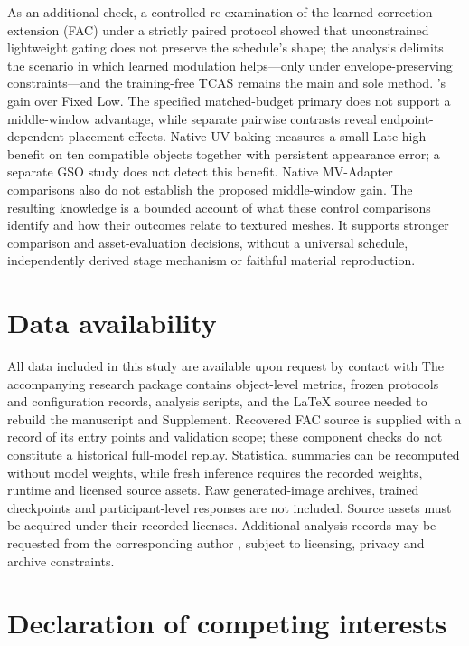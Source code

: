 \documentclass[times,twocolumn,final]{elsarticle}
\providecommand{\DIFadd}[1]{{\protect\color{blue} \sf #1}} %
\providecommand{\DIFdel}[1]{{\protect\color{red} \scriptsize #1}} %
\providecommand{\DIFaddbegin}{} %
\providecommand{\DIFaddend}{} %
\providecommand{\DIFdelbegin}{} %
\providecommand{\DIFdelend}{} %
\begin{document}
\DIFdel{As an additional check, a controlled re-examination of the learned-correction extension (FAC) under a strictly paired protocol showed that unconstrained lightweight gating does not preserve the schedule's shape; the analysis delimits the scenario in which learned modulation helps---only under envelope-preserving constraints---and the training-free TCAS remains the main and sole method. }\DIFdelend \DIFaddbegin \DIFadd{'s gain over Fixed Low. The specified matched-budget primary does not support a middle-window advantage, while separate pairwise contrasts reveal endpoint-dependent placement effects. Native-UV baking measures a small Late-high benefit on ten compatible objects together with persistent appearance error; a separate GSO study does not detect this benefit. Native MV-Adapter comparisons also do not establish the proposed middle-window gain. The resulting knowledge is a bounded account of what these control comparisons identify and how their outcomes relate to textured meshes. It supports stronger comparison and asset-evaluation decisions, without a universal schedule, independently derived stage mechanism or faithful material reproduction.
}\DIFaddend 

\section*{Data availability}

\DIFdelbegin \DIFdel{All data included in this study are available upon request by contact with }\DIFdelend \DIFaddbegin \DIFadd{The accompanying research package contains object-level metrics, frozen protocols and configuration records, analysis scripts, and the LaTeX source needed to rebuild the manuscript and Supplement. Recovered FAC source is supplied with a record of its entry points and validation scope; these component checks do not constitute a historical full-model replay. Statistical summaries can be recomputed without model weights, while fresh inference requires the recorded weights, runtime and licensed source assets. Raw generated-image archives, trained checkpoints and participant-level responses are not included. Source assets must be acquired under their recorded licenses. Additional analysis records may be requested from }\DIFaddend the corresponding author\DIFaddbegin \DIFadd{, subject to licensing, privacy and archive constraints}\DIFaddend .

\section*{Declaration of competing interests}
\end{document}
